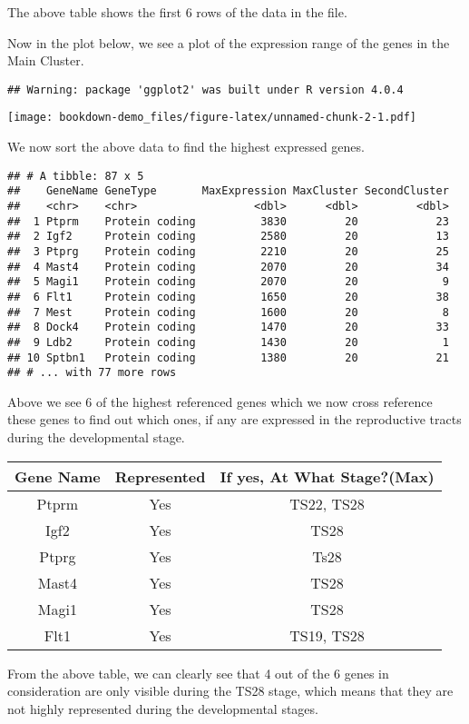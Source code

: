 \documentclass[
]{book}
\begin{document}
The above table shows the first 6 rows of the data in the file.

Now in the plot below, we see a plot of the expression range of the genes in the Main Cluster.

\begin{verbatim}
## Warning: package 'ggplot2' was built under R version 4.0.4
\end{verbatim}

\texttt{[image: bookdown-demo\_files/figure-latex/unnamed-chunk-2-1.pdf]}

We now sort the above data to find the highest expressed genes.

\begin{verbatim}
## # A tibble: 87 x 5
##    GeneName GeneType       MaxExpression MaxCluster SecondCluster
##    <chr>    <chr>                  <dbl>      <dbl>         <dbl>
##  1 Ptprm    Protein coding          3830         20            23
##  2 Igf2     Protein coding          2580         20            13
##  3 Ptprg    Protein coding          2210         20            25
##  4 Mast4    Protein coding          2070         20            34
##  5 Magi1    Protein coding          2070         20             9
##  6 Flt1     Protein coding          1650         20            38
##  7 Mest     Protein coding          1600         20             8
##  8 Dock4    Protein coding          1470         20            33
##  9 Ldb2     Protein coding          1430         20             1
## 10 Sptbn1   Protein coding          1380         20            21
## # ... with 77 more rows
\end{verbatim}

Above we see 6 of the highest referenced genes which we now cross reference these genes to find out which ones, if any are expressed in the reproductive tracts during the developmental stage.

\begin{longtable}[]{@{}ccc@{}}
\toprule
Gene Name & Represented & If yes, At What Stage?(Max)\tabularnewline
\midrule
\endhead
Ptprm & Yes & TS22, TS28\tabularnewline
Igf2 & Yes & TS28\tabularnewline
Ptprg & Yes & Ts28\tabularnewline
Mast4 & Yes & TS28\tabularnewline
Magi1 & Yes & TS28\tabularnewline
Flt1 & Yes & TS19, TS28\tabularnewline
\bottomrule
\end{longtable}

From the above table, we can clearly see that 4 out of the 6 genes in consideration are only visible during the TS28 stage, which means that they are not highly represented during the developmental stages.
\end{document}

